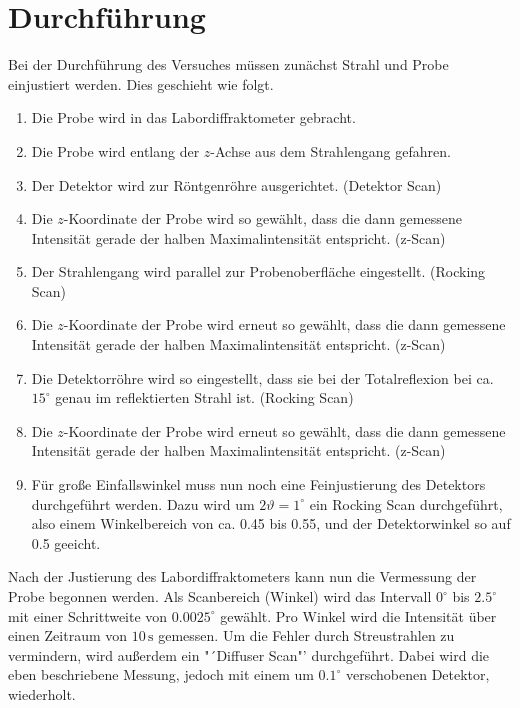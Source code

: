 

\section{Durchführung}
Bei der Durchführung des Versuches müssen zunächst Strahl und Probe einjustiert 
werden. Dies geschieht wie folgt.
\begin{enumerate}
\item Die Probe wird in das Labordiffraktometer gebracht.
\item Die Probe wird entlang der $z$-Achse aus dem Strahlengang gefahren.
\item Der Detektor wird zur Röntgenröhre ausgerichtet. (Detektor Scan)
\item Die $z$-Koordinate der Probe wird so gewählt, dass die dann gemessene 
Intensität gerade der halben Maximalintensität entspricht. (z-Scan)
\item Der Strahlengang wird parallel zur Probenoberfläche eingestellt. (Rocking 
Scan)
\item Die $z$-Koordinate der Probe wird erneut so gewählt, dass die dann 
gemessene Intensität gerade der halben Maximalintensität entspricht. (z-Scan)
\item Die Detektorröhre wird so eingestellt, dass sie bei der Totalreflexion bei 
ca. $15^\circ$ genau im reflektierten Strahl ist. (Rocking Scan)
\item Die $z$-Koordinate der Probe wird erneut so gewählt, dass die dann 
gemessene Intensität gerade der halben Maximalintensität entspricht. (z-Scan)
\item Für große Einfallswinkel muss nun noch eine Feinjustierung des Detektors 
durchgeführt werden. Dazu wird um $2\vartheta=1^\circ$ ein Rocking Scan 
durchgeführt, also einem Winkelbereich von ca. 0.45 bis 0.55, und der 
Detektorwinkel so auf 0.5 geeicht.
\end{enumerate}
Nach der Justierung des Labordiffraktometers kann nun die Vermessung der Probe 
begonnen werden. Als Scanbereich (Winkel) wird das Intervall $0^\circ$ bis 
$2.5^\circ$ mit einer Schrittweite von $0.0025^\circ$ gewählt. Pro Winkel 
wird die Intensität über einen Zeitraum von $10 \, \text{s}$ gemessen. Um die 
Fehler durch Streustrahlen zu vermindern, wird außerdem ein "´Diffuser Scan"' 
durchgeführt. Dabei wird die eben beschriebene Messung, jedoch mit einem um 
$0.1^\circ$ verschobenen Detektor, wiederholt.